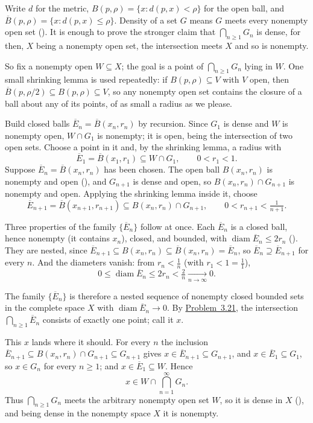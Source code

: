 \documentclass[main.tex]{subfiles}
\begin{document}
\begin{SolutionBlue}
Write $d$ for the metric, $B(p,\rho)=\{x:d(p,x)<\rho\}$ for the open ball, and
$\overline B(p,\rho)=\{x:d(p,x)\le\rho\}$. Density of a set $G$ means $G$ meets every nonempty open set
(). It is enough to prove the stronger claim that $\bigcap_{n\ge 1}G_n$ is dense, for then,
$X$ being a nonempty open set, the intersection meets $X$ and so is nonempty.

So fix a nonempty open $W\subseteq X$; the goal is a point of $\bigcap_{n\ge1}G_n$ lying in $W$. One
small shrinking lemma is used repeatedly: if $B(p,\rho)\subseteq V$ with $V$ open, then
$\overline B(p,\rho/2)\subseteq B(p,\rho)\subseteq V$, so any nonempty open set contains the closure of a
ball about any of its points, of as small a radius as we please.

Build closed balls $\overline E_n=\overline B(x_n,r_n)$ by recursion. Since $G_1$ is dense and $W$ is
nonempty open, $W\cap G_1$ is nonempty; it is open, being the intersection of two open sets. Choose a
point in it and, by the shrinking lemma, a radius with
\[
  \overline E_1=\overline B(x_1,r_1)\subseteq W\cap G_1,\qquad 0<r_1<1 .
\]
Suppose $\overline E_n=\overline B(x_n,r_n)$ has been chosen. The open ball $B(x_n,r_n)$ is nonempty and
open (), and $G_{n+1}$ is dense and open, so $B(x_n,r_n)\cap G_{n+1}$ is nonempty and open.
Applying the shrinking lemma inside it, choose
\[
  \overline E_{n+1}=\overline B(x_{n+1},r_{n+1})\subseteq B(x_n,r_n)\cap G_{n+1},
  \qquad 0<r_{n+1}<\tfrac{1}{n+1} .
\]

Three properties of the family $\{\overline E_n\}$ follow at once. Each $\overline E_n$ is a closed ball,
hence nonempty (it contains $x_n$), closed, and bounded, with $\operatorname{diam}\overline E_n\le 2r_n$
(). They are nested, since
$\overline E_{n+1}\subseteq B(x_n,r_n)\subseteq\overline B(x_n,r_n)=\overline E_n$, so
$\overline E_n\supseteq\overline E_{n+1}$ for every $n$. And the diameters vanish: from $r_n<\tfrac1n$
(with $r_1<1=\tfrac11$),
\[
  0\le\operatorname{diam}\overline E_n\le 2r_n<\tfrac{2}{n}\xrightarrow[n\to\infty]{}0 .
\]

The family $\{\overline E_n\}$ is therefore a nested sequence of nonempty closed bounded sets in the
complete space $X$ with $\operatorname{diam}\overline E_n\to 0$. By
\hyperlink{prob:3.21}{Problem~3.21}, the intersection $\bigcap_{n\ge1}\overline E_n$ consists of exactly
one point; call it $x$.

This $x$ lands where it should. For every $n$ the inclusion
$\overline E_{n+1}\subseteq B(x_n,r_n)\cap G_{n+1}\subseteq G_{n+1}$ gives $x\in\overline E_{n+1}\subseteq
G_{n+1}$, and $x\in\overline E_1\subseteq G_1$, so $x\in G_n$ for every $n\ge1$; and $x\in\overline
E_1\subseteq W$. Hence
\[
  x\in W\cap\bigcap_{n=1}^{\infty}G_n .
\]
Thus $\bigcap_{n\ge1}G_n$ meets the arbitrary nonempty open set $W$, so it is dense in $X$ (),
and being dense in the nonempty space $X$ it is nonempty.
\end{SolutionBlue}
\end{document}
